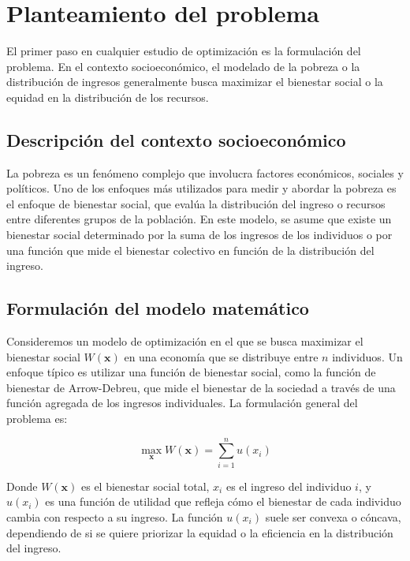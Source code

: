 \section{Planteamiento del problema}

\begin{flushleft}
	El primer paso en cualquier estudio de optimización es la formulación del problema. En el contexto socioeconómico, el modelado de la pobreza o la distribución de ingresos generalmente busca maximizar el bienestar social o la equidad en la distribución de los recursos.
\end{flushleft}

\subsection{Descripción del contexto socioeconómico}

\begin{flushleft}
	La pobreza es un fenómeno complejo que involucra factores económicos, sociales y políticos. Uno de los enfoques más utilizados para medir y abordar la pobreza es el enfoque de bienestar social, que evalúa la distribución del ingreso o recursos entre diferentes grupos de la población. En este modelo, se asume que existe un bienestar social determinado por la suma de los ingresos de los individuos o por una función que mide el bienestar colectivo en función de la distribución del ingreso.
\end{flushleft}

\subsection{Formulación del modelo matemático}

\begin{flushleft}
	Consideremos un modelo de optimización en el que se busca maximizar el bienestar social $W(\mathbf{x})$ en una economía que se distribuye entre $n$ individuos. Un enfoque típico es utilizar una función de bienestar social, como la función de bienestar de Arrow-Debreu, que mide el bienestar de la sociedad a través de una función agregada de los ingresos individuales. La formulación general del problema es:
\end{flushleft}

$$
\max_{\mathbf{x}} W(\mathbf{x})=\sum_{i=1}^{n} u\left(x_{i}\right)
$$

\begin{flushleft}
	Donde $W(\mathbf{x})$ es el bienestar social total, $x_{i}$ es el ingreso del individuo $i$, y $u\left(x_{i}\right)$ es una función de utilidad que refleja cómo el bienestar de cada individuo cambia con respecto a su ingreso. La función $u\left(x_{i}\right)$ suele ser convexa o cóncava, dependiendo de si se quiere priorizar la equidad o la eficiencia en la distribución del ingreso.
\end{flushleft}

